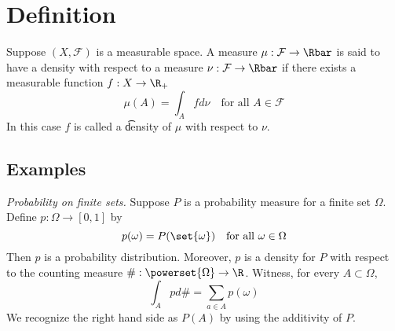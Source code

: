 

\section*{Definition}

Suppose $(X, \mathcal{F} )$ is a measurable space.
A measure $\mu : \mathcal{F}  \to \Rbar$ is said to have a density with respect to a measure $\nu : \mathcal{F}  \to \Rbar$ if there exists a measurable function $f: X \to \R _+$
\[
\mu (A) = \int _A f d\nu  \quad \text{for all } A \in \mathcal{F}
\]
In this case $f$ is called a \t{density} of $\mu $ with respect to $\nu $.

\subsection*{Examples}

\textit{Probability on finite sets.}
Suppose $P$ is a probability measure for a finite set $\Omega $.
Define $p: \Omega  \to [0,1]$ by
\[
p(\omega ) = P(\set{\omega }) \quad \text{for all } \omega  \in \Omega
\]
Then $p$ is a probability distribution.
Moreover, $p$ is a density for $P$ with respect to the counting measure $\#: \powerset{\Omega } \to \R $.
Witness, for every $A \subset \Omega $,
\[
\int_{A} p d\# = \sum_{a \in A} p(\omega )
\]
We recognize the right hand side as $P(A)$ by using the additivity of $P$.

\blankpage